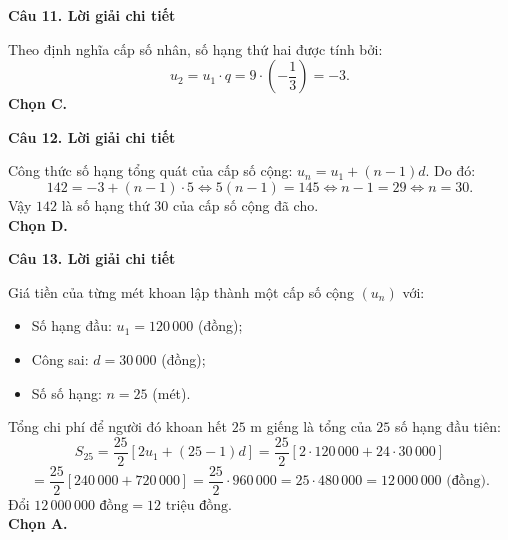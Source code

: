 \documentclass[12pt, a4paper]{article}
\begin{document}
\noindent\textbf{Câu 11. Lời giải chi tiết}\par
\begin{tcolorbox}[enhanced,breakable,colback=solutionbg,colframe=secondary!50!black,frame hidden,borderline west={3pt}{0pt}{secondary!50!black}]
Theo định nghĩa cấp số nhân, số hạng thứ hai được tính bởi:
$$u_2 = u_1 \cdot q = 9 \cdot \left(-\dfrac{1}{3}\right) = -3.$$
\textbf{Chọn C.}
\end{tcolorbox}

\noindent\textbf{Câu 12. Lời giải chi tiết}\par
\begin{tcolorbox}[enhanced,breakable,colback=solutionbg,colframe=secondary!50!black,frame hidden,borderline west={3pt}{0pt}{secondary!50!black}]
Công thức số hạng tổng quát của cấp số cộng: $u_n = u_1 + (n - 1)d$. Do đó:
$$142 = -3 + (n - 1)\cdot 5 \Leftrightarrow 5(n - 1) = 145 \Leftrightarrow n - 1 = 29 \Leftrightarrow n = 30.$$
Vậy $142$ là số hạng thứ $30$ của cấp số cộng đã cho.\\
\textbf{Chọn D.}
\end{tcolorbox}

\noindent\textbf{Câu 13. Lời giải chi tiết}\par
\begin{tcolorbox}[enhanced,breakable,colback=solutionbg,colframe=secondary!50!black,frame hidden,borderline west={3pt}{0pt}{secondary!50!black}]
Giá tiền của từng mét khoan lập thành một cấp số cộng $(u_n)$ với:
\begin{itemize}[leftmargin=1.5em]
\item Số hạng đầu: $u_1 = 120\,000$ (đồng);
\item Công sai: $d = 30\,000$ (đồng);
\item Số số hạng: $n = 25$ (mét).
\end{itemize}
Tổng chi phí để người đó khoan hết $25\text{ m}$ giếng là tổng của $25$ số hạng đầu tiên:
$$S_{25} = \dfrac{25}{2}\left[2u_1 + (25 - 1)d\right] = \dfrac{25}{2}\left[2 \cdot 120\,000 + 24 \cdot 30\,000\right]$$
$$= \dfrac{25}{2}\left[240\,000 + 720\,000\right] = \dfrac{25}{2} \cdot 960\,000 = 25 \cdot 480\,000 = 12\,000\,000\text{ (đồng)}.$$
Đổi $12\,000\,000\text{ đồng} = 12\text{ triệu đồng}$.\\
\textbf{Chọn A.}
\end{tcolorbox}
\end{document}
